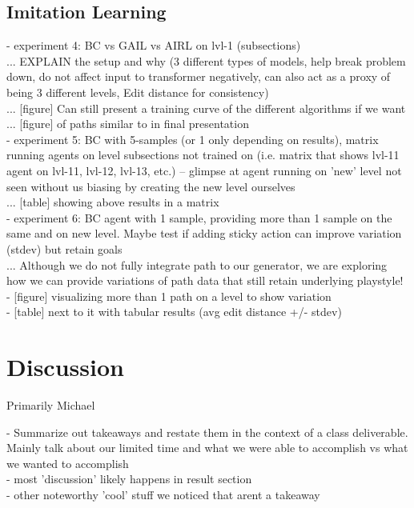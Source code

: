 \documentclass[letterpaper]{article} %
\begin{document}
\subsection{Imitation Learning}
- experiment 4: BC vs GAIL vs AIRL on lvl-1 (subsections)\\
... EXPLAIN the setup and why (3 different types of models, help break problem down, do not affect input to transformer negatively, can also act as a proxy of being 3 different levels, Edit distance for consistency) \\
... [figure] Can still present a training curve of the different algorithms if we want\\
... [figure] of paths similar to in final presentation\\

- experiment 5: BC with 5-samples (or 1 only depending on results), matrix running agents on level subsections not trained on (i.e. matrix that shows lvl-11 agent on lvl-11, lvl-12, lvl-13, etc.) -- glimpse at agent running on 'new' level not seen without us biasing by creating the new level ourselves\\
... [table] showing above results in a matrix\\

- experiment 6: BC agent with 1 sample, providing more than 1 sample on the same and on new level. Maybe test if adding sticky action can improve variation (stdev) but retain goals\\
... Although we do not fully integrate path to our generator, we are exploring how we can provide variations of path data that still retain underlying playstyle!\\
- [figure] visualizing more than 1 path on a level to show variation\\
- [table] next to it with tabular results (avg edit distance +/- stdev)\\

\section{Discussion}
Primarily Michael 

- Summarize out takeaways and restate them in the context of a class deliverable. Mainly talk about our limited time and what we were able to accomplish vs what we wanted to accomplish\\
- most 'discussion' likely happens in result section\\
- other noteworthy 'cool' stuff we noticed that arent a takeaway\\
\end{document}
